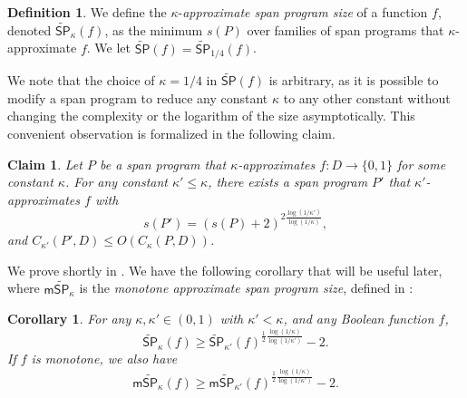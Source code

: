 \documentclass[11pt]{article}
\numberwithin{equation}{section}
\newtheorem{corollary}[theorem]{Corollary}
\newtheorem{claim}[theorem]{Claim}
\theoremstyle{definition}
\newtheorem{definition}[theorem]{Definition}
\theoremstyle{plain}
\begin{document}
\begin{definition}\label{def:approx-SP}
We define the $\kappa$-\emph{approximate span program size} of a function $f$, denoted $\widetilde{\mathsf{SP}}_{\kappa}(f)$, as the minimum $s(P)$ over families of span programs that $\kappa$-approximate $f$. We let $\widetilde{\mathsf{SP}}(f)=\widetilde{\mathsf{SP}}_{1/4}(f)$. 
\end{definition}
We note that the choice of $\kappa=1/4$ in $\widetilde{\mathsf{SP}}(f)$ is arbitrary, as it is possible to modify a span program to reduce any constant $\kappa$ to any other constant without changing the complexity or the logarithm of the size asymptotically. This convenient observation is formalized in the following claim.



\begin{claim}\label{claim:kappa}
  Let $P$ be a span program that $\kappa$-approximates $f:D\rightarrow\{0,1\}$ for some constant $\kappa$. For any constant $\kappa'\leq \kappa$, there exists a span program $P'$ that $\kappa'$-approximates $f$ with
%
%
\begin{equation}  
%
%
 s(P')=(s(P)+2)^{2\frac{\log(1/\kappa')}{\log(1/\kappa)}},   %
\end{equation}
and $C_{\kappa'}(P',D)\leq O\left(C_\kappa(P,D)\right)$. 
\end{claim}

%
%
We prove  shortly in . %
We have the following corollary that will be useful later, where $\mathsf{m}\widetilde{\mathsf{SP}}_\kappa$ is the \emph{monotone approximate span program size}, defined in :
\begin{corollary}\label{cor:kappa}
For any $\kappa,\kappa'\in (0,1)$ with $\kappa'<\kappa$, and any Boolean function $f$,
$$\widetilde{\mathsf{SP}}_{\kappa}(f)\geq \widetilde{\mathsf{SP}}_{\kappa'}(f)^{\frac{1}{2}\frac{\log(1/\kappa)}{\log(1/\kappa')}}-2.$$
If $f$ is monotone, we also have
$$\mathsf{m}\widetilde{\mathsf{SP}}_{\kappa}(f)\geq \mathsf{m}\widetilde{\mathsf{SP}}_{\kappa'}(f)^{\frac{1}{2}\frac{\log(1/\kappa)}{\log(1/\kappa')}}-2.$$
\end{corollary}
\end{document}

